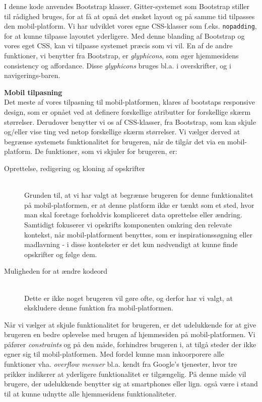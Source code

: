 I denne kode anvendes Bootstrap klasser. 
Gitter-systemet som Bootstrap stiller til rådighed bruges, for at få at opnå det ønsket layout og på samme tid tilpasses den mobil-platform.
Vi har udviklet vores egne CSS-klasser som f.eks. \texttt{nopadding}, for at kunne tilpasse layoutet yderligere. 
Med denne blanding af Bootstrap og vores eget CSS, kan vi tilpasse systemet præcis som vi vil. 
En af de andre funktioner, vi benytter fra Bootstrap, er \textit{glyphicons}, som øger hjemmesidens consistency og affordance.
Disse \textit{glyphicons} bruges bl.a. i overskrifter, og i navigerings-baren.

\textbf{Mobil tilpasning}\hfill\\
Det meste af vores tilpasning til mobil-platformen, klares af bootstaps responsive design, som er opnået ved at definere forskellige atributter for forskellige skærm størrelser.
Derudover benytter vi os af CSS-klasser, fra Bootstrap, som kan skjule og/eller vise ting ved netop forskellige skærm størrelser.
Vi vælger derved at begrænse systemets funktionalitet for brugeren, når de tilgår det via en mobil-platform. De funktioner, som vi skjuler for brugeren, er:

\begin{description}
\item[Oprettelse, redigering og kloning af opskrifter]\hfill\\
Grunden til, at vi har valgt at begrænse brugeren for denne funktionalitet på mobil-platformen, er at denne platform ikke er tænkt som et sted, hvor man skal foretage forholdvis kompliceret data oprettelse eller ændring.
Samtidigt fokuserer vi opskrifts komponenten omkring den relevate kontekst, når mobil-platforment benyttes, som er inspirationssøgning eller madlavning - i disse kontekster er det kun nødvendigt at kunne finde opskrifter og følge dem.
\item[Muligheden for at ændre kodeord]\hfill\\
Dette er ikke noget brugeren vil gøre ofte, og derfor har vi valgt, at ekskludere denne funktion fra mobil-platformen.
\end{description}

Når vi vælger at skjule funktionalitet for brugeren, er det udelukkende for at give brugeren en bedre oplevelse med brugen af hjemmesiden på mobil-platformen.
Vi påfører \textit{constraints} og på den måde, forhindres brugeren i, at tilgå steder der ikke egner sig til mobil-platformen.
Med fordel kunne man inkoorporere alle funktioner vha. \textit{overflow menuer} bl.a. kendt fra Google's tjenester, hvor tre prikker indikerer at yderligere funktionalitet er tilgængelig. \cite{actionbar}
På denne måde vil brugere, der udelukkende benytter sig at smartphones eller lign. også være i stand til at kunne udnytte alle hjemmesidens funktionaliteter.

